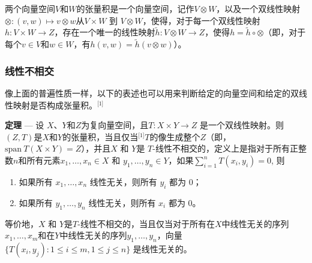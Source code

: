 两个向量空间\( V \)和\( W \)的张量积是一个向量空间，记作\( V \otimes W \)，以及一个双线性映射\(\otimes : (v, w) \mapsto v \otimes w\)从\( V \times W \) 到 \( V \otimes W \)，使得，对于每一个双线性映射\( h: V \times W \to Z \)，存在一个唯一的线性映射\( \tilde{h}: V \otimes W \to Z \)，使得\(h = \tilde{h} \circ \otimes\)（即，对于每个\( v \in V \)和\( w \in W \)，有\( h(v, w) = \tilde{h}(v \otimes w) \)）。
\subsubsection{线性不相交}
像上面的普遍性质一样，以下的表述也可以用来判断给定的向量空间和给定的双线性映射是否构成张量积。\(^\text{[1]}\)

\textbf{定理} — 设 \( X \)、\( Y \)和\( Z \)为复向量空间，且\( T: X \times Y \to Z \) 是一个双线性映射。则 \( (Z, T) \)是\( X \)和\( Y \)的张量积，当且仅当\(^\text{[1]}\)\( T \)的像生成整个\( Z \)（即，\( \text{span} \ T(X \times Y) = Z \)），并且\( X \) 和 \( Y \)是 \( T \)-线性不相交的，定义上是指对于所有正整数\( n \)和所有元素\( x_1, \dots, x_n \in X \) 和 \( y_1, \dots, y_n \in Y \)，如果\(\sum_{i=1}^{n} T(x_i, y_i) = 0\), 则  
\begin{enumerate}
\item 如果所有 \( x_1, \dots, x_n \) 线性无关，则所有 \( y_i \) 都为 0；  
\item 如果所有 \( y_1, \dots, y_n \) 线性无关，则所有 \( x_i \) 都为 0。
\end{enumerate}
等价地，\( X \) 和 \( Y \)是\( T \)-线性不相交的，当且仅当对于所有在\( X \)中线性无关的序列\( x_1, \dots, x_m \)和在\( Y \)中线性无关的序列\( y_1, \dots, y_n \)，向量\(\{ T(x_i, y_j) : 1 \leq i \leq m, 1 \leq j \leq n \}\)
是线性无关的。